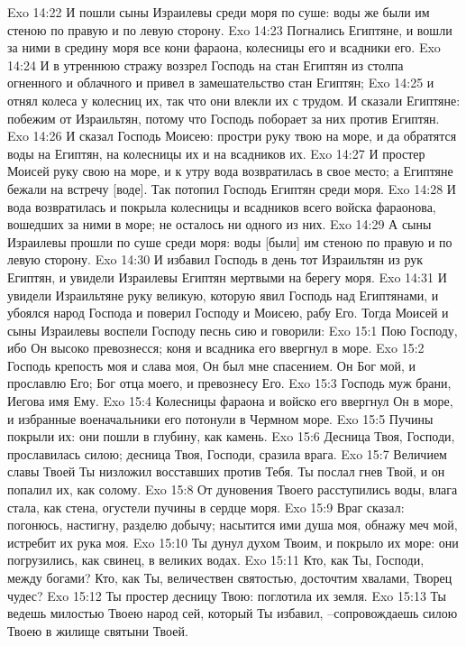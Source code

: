 Exo 14:22  И пошли сыны Израилевы среди моря по суше: воды же были им стеною по правую и по левую сторону.
Exo 14:23  Погнались Египтяне, и вошли за ними в средину моря все кони фараона, колесницы его и всадники его.
Exo 14:24  И в утреннюю стражу воззрел Господь на стан Египтян из столпа огненного и облачного и привел в замешательство стан Египтян;
Exo 14:25  и отнял колеса у колесниц их, так что они влекли их с трудом. И сказали Египтяне: побежим от Израильтян, потому что Господь поборает за них против Египтян.
Exo 14:26  И сказал Господь Моисею: простри руку твою на море, и да обратятся воды на Египтян, на колесницы их и на всадников их.
Exo 14:27  И простер Моисей руку свою на море, и к утру вода возвратилась в свое место; а Египтяне бежали на встречу [воде]. Так потопил Господь Египтян среди моря.
Exo 14:28  И вода возвратилась и покрыла колесницы и всадников всего войска фараонова, вошедших за ними в море; не осталось ни одного из них.
Exo 14:29  А сыны Израилевы прошли по суше среди моря: воды [были] им стеною по правую и по левую сторону.
Exo 14:30  И избавил Господь в день тот Израильтян из рук Египтян, и увидели Израилевы Египтян мертвыми на берегу моря.
Exo 14:31  И увидели Израильтяне руку великую, которую явил Господь над Египтянами, и убоялся народ Господа и поверил Господу и Моисею, рабу Его. Тогда Моисей и сыны Израилевы воспели Господу песнь сию и говорили:
Exo 15:1  Пою Господу, ибо Он высоко превознесся; коня и всадника его ввергнул в море.
Exo 15:2  Господь крепость моя и слава моя, Он был мне спасением. Он Бог мой, и прославлю Его; Бог отца моего, и превознесу Его.
Exo 15:3  Господь муж брани, Иегова имя Ему.
Exo 15:4  Колесницы фараона и войско его ввергнул Он в море, и избранные военачальники его потонули в Чермном море.
Exo 15:5  Пучины покрыли их: они пошли в глубину, как камень.
Exo 15:6  Десница Твоя, Господи, прославилась силою; десница Твоя, Господи, сразила врага.
Exo 15:7  Величием славы Твоей Ты низложил восставших против Тебя. Ты послал гнев Твой, и он попалил их, как солому.
Exo 15:8  От дуновения Твоего расступились воды, влага стала, как стена, огустели пучины в сердце моря.
Exo 15:9  Враг сказал: погонюсь, настигну, разделю добычу; насытится ими душа моя, обнажу меч мой, истребит их рука моя.
Exo 15:10  Ты дунул духом Твоим, и покрыло их море: они погрузились, как свинец, в великих водах.
Exo 15:11  Кто, как Ты, Господи, между богами? Кто, как Ты, величествен святостью, досточтим хвалами, Творец чудес?
Exo 15:12  Ты простер десницу Твою: поглотила их земля.
Exo 15:13  Ты ведешь милостью Твоею народ сей, который Ты избавил, --сопровождаешь силою Твоею в жилище святыни Твоей.
